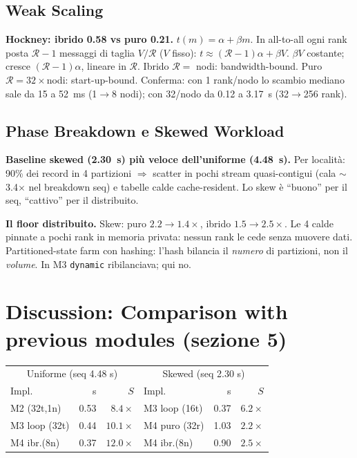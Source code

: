 \documentclass[11pt,a4paper]{article}
\begin{document}
\subsection{Weak Scaling}

\begin{deriv}
\textbf{Hockney: ibrido 0.58 vs puro 0.21.} $t(m)=\alpha+\beta m$. In all-to-all ogni rank posta $\mathcal{R}-1$ messaggi di taglia $V/\mathcal{R}$ ($V$ fisso): $t\approx(\mathcal{R}-1)\alpha+\beta V$. $\beta V$ costante; cresce $(\mathcal{R}-1)\alpha$, lineare in $\mathcal{R}$. Ibrido $\mathcal{R}=$ nodi: bandwidth-bound. Puro $\mathcal{R}=32\times$nodi: start-up-bound. Conferma: con 1 rank/nodo lo scambio mediano sale da 15 a 52~ms (1$\to$8 nodi); con 32/nodo da 0.12 a 3.17~s (32$\to$256 rank).
\end{deriv}

\subsection{Phase Breakdown e Skewed Workload}

\begin{deriv}
\textbf{Baseline skewed (2.30~s) più veloce dell'uniforme (4.48~s).} Per località: 90\% dei record in 4 partizioni $\Rightarrow$ scatter in pochi stream quasi-contigui (cala $\sim$3.4$\times$ nel breakdown seq) e tabelle calde cache-resident. Lo skew è ``buono'' per il seq, ``cattivo'' per il distribuito.
\end{deriv}

\begin{difesa}
\textbf{Il floor distribuito.} Skew: puro $2.2\to1.4\times$, ibrido $1.5\to2.5\times$. Le 4 calde pinnate a pochi rank in memoria privata: nessun rank le cede senza muovere dati. Partitioned-state farm con hashing: l'hash bilancia il \emph{numero} di partizioni, non il \emph{volume}. In M3 \texttt{dynamic} ribilanciava; qui no.
\end{difesa}

\section{Discussion: Comparison with previous modules (sezione 5)}

\begin{table}[H]\centering\small
\begin{tabular}{@{}lrr|lrr@{}}\toprule
\multicolumn{3}{c|}{Uniforme (seq 4.48 s)} & \multicolumn{3}{c}{Skewed (seq 2.30 s)} \\
Impl. & s & $S$ & Impl. & s & $S$ \\\midrule
M2 (32t,1n) & 0.53 & $8.4\times$ & M3 loop (16t) & 0.37 & $6.2\times$ \\
M3 loop (32t) & 0.44 & $10.1\times$ & M4 puro (32r) & 1.03 & $2.2\times$ \\
M4 ibr.(8n) & 0.37 & $12.0\times$ & M4 ibr.(8n) & 0.90 & $2.5\times$ \\\bottomrule
\end{tabular}
\end{table}
\end{document}
